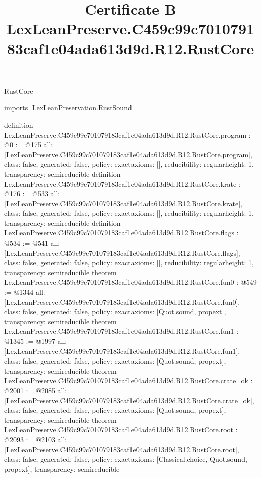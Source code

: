 \begin{lexlean}{RustCore}
\title{Certificate B LexLeanPreserve.C459c99c701079183caf1e04ada613d9d.R12.RustCore}
\begin{coremodule}
imports [LexLeanPreservation.RustSound]

definition LexLeanPreserve.C459c99c701079183caf1e04ada613d9d.R12.RustCore.program : @0 := @175 {
  all: [LexLeanPreserve.C459c99c701079183caf1e04ada613d9d.R12.RustCore.program],
  class: false,
  generated: false,
  policy: exact{axioms: []},
  reducibility: regular{height: 1},
  transparency: semireducible
}
definition LexLeanPreserve.C459c99c701079183caf1e04ada613d9d.R12.RustCore.krate : @176 := @533 {
  all: [LexLeanPreserve.C459c99c701079183caf1e04ada613d9d.R12.RustCore.krate],
  class: false,
  generated: false,
  policy: exact{axioms: []},
  reducibility: regular{height: 1},
  transparency: semireducible
}
definition LexLeanPreserve.C459c99c701079183caf1e04ada613d9d.R12.RustCore.flags : @534 := @541 {
  all: [LexLeanPreserve.C459c99c701079183caf1e04ada613d9d.R12.RustCore.flags],
  class: false,
  generated: false,
  policy: exact{axioms: []},
  reducibility: regular{height: 1},
  transparency: semireducible
}
theorem LexLeanPreserve.C459c99c701079183caf1e04ada613d9d.R12.RustCore.fun0 : @549 := @1344 {
  all: [LexLeanPreserve.C459c99c701079183caf1e04ada613d9d.R12.RustCore.fun0],
  class: false,
  generated: false,
  policy: exact{axioms: [Quot.sound, propext]},
  transparency: semireducible
}
theorem LexLeanPreserve.C459c99c701079183caf1e04ada613d9d.R12.RustCore.fun1 : @1345 := @1997 {
  all: [LexLeanPreserve.C459c99c701079183caf1e04ada613d9d.R12.RustCore.fun1],
  class: false,
  generated: false,
  policy: exact{axioms: [Quot.sound, propext]},
  transparency: semireducible
}
theorem LexLeanPreserve.C459c99c701079183caf1e04ada613d9d.R12.RustCore.crate_ok : @2001 := @2085 {
  all: [LexLeanPreserve.C459c99c701079183caf1e04ada613d9d.R12.RustCore.crate_ok],
  class: false,
  generated: false,
  policy: exact{axioms: [Quot.sound, propext]},
  transparency: semireducible
}
theorem LexLeanPreserve.C459c99c701079183caf1e04ada613d9d.R12.RustCore.root : @2093 := @2103 {
  all: [LexLeanPreserve.C459c99c701079183caf1e04ada613d9d.R12.RustCore.root],
  class: false,
  generated: false,
  policy: exact{axioms: [Classical.choice, Quot.sound, propext]},
  transparency: semireducible
}


\end{coremodule}
\end{lexlean}
